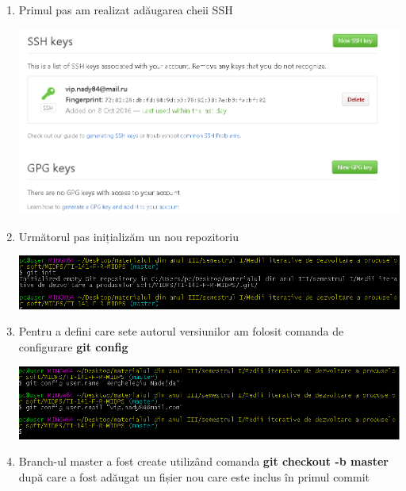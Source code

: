 \begin{enumerate}
\item Primul pas am realizat adăugarea cheii SSH 

\begin{minipage}{\linewidth}
	\centering
	\includegraphics[width=17cm]{SSH01}
\end{minipage}
\break

\item Următorul pas inițializăm un nou repozitoriu

\begin{minipage}{\linewidth}
	\centering
	\includegraphics[width=17cm]{init02}
\end{minipage}
\break

\item Pentru a defini care sete autorul versiunilor am folosit comanda de configurare \textbf{git config}

\begin{minipage}{\linewidth}
	\centering
	\includegraphics[width=17cm]{config03}
\end{minipage}
\break

\item Branch-ul master a fost create utilizând comanda \textbf{git checkout -b master} după care a fost adăugat un fișier nou care este inclus în primul commit


\end{enumerate}
